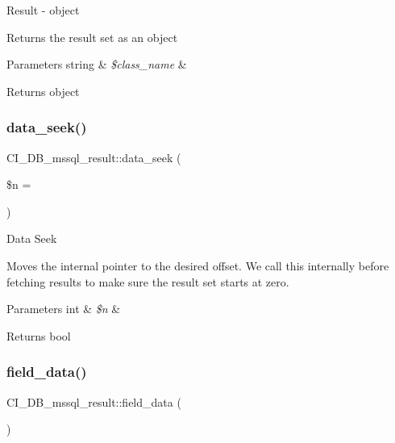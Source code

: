 Result -\/ object

Returns the result set as an object


\begin{DoxyParams}[1]{Parameters}
string & {\em \$class\+\_\+name} & \\
\hline
\end{DoxyParams}
\begin{DoxyReturn}{Returns}
object 
\end{DoxyReturn}
\mbox{\label{class_c_i___d_b__mssql__result_ad6e178bd17e16d0a27489870aebe4900}} 
\subsubsection{\texorpdfstring{data\+\_\+seek()}{data\_seek()}}
{\footnotesize\ttfamily C\+I\+\_\+\+D\+B\+\_\+mssql\+\_\+result\+::data\+\_\+seek (\begin{DoxyParamCaption}\item[{}]{\$n = {} }\end{DoxyParamCaption})}

Data Seek

Moves the internal pointer to the desired offset. We call this internally before fetching results to make sure the result set starts at zero.


\begin{DoxyParams}[1]{Parameters}
int & {\em \$n} & \\
\hline
\end{DoxyParams}
\begin{DoxyReturn}{Returns}
bool 
\end{DoxyReturn}
\mbox{\label{class_c_i___d_b__mssql__result_af626a371016f12c8bcd9c896baa9930d}} 
\subsubsection{\texorpdfstring{field\+\_\+data()}{field\_data()}}
{\footnotesize\ttfamily C\+I\+\_\+\+D\+B\+\_\+mssql\+\_\+result\+::field\+\_\+data (\begin{DoxyParamCaption}{ }\end{DoxyParamCaption})}

